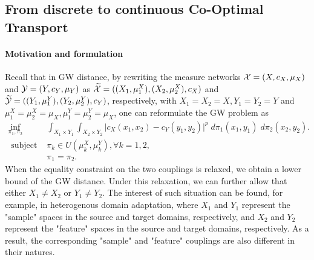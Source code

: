 \subsection{From discrete to continuous Co-Optimal Transport}

\paragraph{Motivation and formulation} Recall that in GW distance,
by rewriting the measure networks $\mathcal X = (X, c_X, \mu_X)$ and $\mathcal Y = (Y, c_Y, \mu_Y)$ as
$\widetilde{\mathcal X} = ((X_1, \mu_1^X), (X_2, \mu_2^X), c_X)$ and
$\widetilde{\mathcal Y} = ((Y_1, \mu_1^Y), (Y_2, \mu_2^Y), c_Y)$, respectively, with
$X_1 = X_2 = X, Y_1 = Y_2 = Y$ and
$\mu_1^X = \mu^X_2 = \mu_X, \mu_1^Y = \mu^Y_2 = \mu_X$, one can reformulate the GW problem as
\begin{equation}
  \begin{split}
    \inf_{\pi_1, \pi_2}
    &\int_{X_1 \times Y_1} \int_{X_2 \times Y_2}
    \big\vert c_X(x_1, x_2) - c_Y(y_1, y_2) \big\vert^p \; d\pi_1(x_1, y_1) \; d\pi_2(x_2, y_2). \\
    \text{ subject to: } &\pi_k \in U(\mu_k^X, \mu_k^Y), \forall k = 1,2, \\
    &\pi_1 = \pi_2.
  \end{split}
\end{equation}
When the equality constraint on the two couplings is relaxed,
we obtain a lower bound of the GW distance. Under this relaxation,
we can further allow that either $X_1 \neq X_2$ or $Y_1 \neq Y_2$.
The interest of such situation can be found, for example, in heterogenous domain adaptation,
where $X_1$ and $Y_1$ represent the "sample" spaces in the source and target domains, respectively,
and $X_2$ and $Y_2$ represent the "feature" spaces in the source and target domains, respectively.
As a result, the corresponding "sample" and "feature" couplings are also different in their natures.

